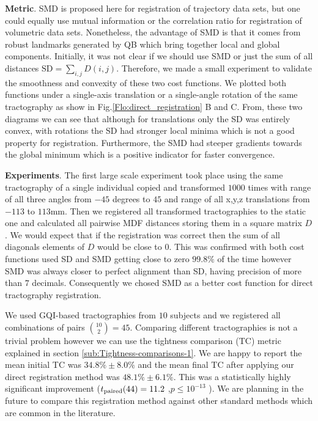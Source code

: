 \documentclass[preprint,authoryear,a4paper,10pt,onecolumn]{elsarticle}
\begin{document}
\textbf{Metric}. SMD is proposed here for registration of trajectory
data sets, but one could equally use mutual
information\cite{maes1997multimodality} or the correlation ratio
\cite{roche1998correlation} for registration of volumetric data
sets. Nonetheless, the advantage of SMD is that it comes from robust
landmarks generated by QB which bring together local and global
components. Initially, it was not clear if we should use SMD or just the
sum of all distances $\mathrm{SD}=\sum_{i,j}D(i,j)$.  Therefore, we made
a small experiment to validate the smoothness and convexity of these two
cost functions. We plotted both functions under a single-axis
translation or a single-angle rotation of the same tractography as show
in Fig.\ref{Flo:direct_registration} B and C. From, these two diagrams
we can see that although for translations only the SD was entirely
convex, with rotations the SD had stronger local minima which is not a
good property for registration. Furthermore, the SMD had steeper
gradients towards the global minimum which is a positive indicator for
faster convergence.

\textbf{Experiments}. The first large scale experiment took place using
the same tractography of a single individual copied and transformed
$1000$ times with range of all three angles from $-45$ degrees to $45$
and range of all x,y,z translations from $-113$ to $113$mm.  Then we
registered all transformed tractographies to the static one and
calculated all pairwise MDF distances storing them in a square matrix
$D$. We would expect that if the registration was correct then the sum
of all diagonals elements of $D$ would be close to $0$.  This was
confirmed with both cost functions used SD and SMD getting close to zero
$99.8\%$ of the time however SMD was always closer to perfect alignment
than SD, having precision of more than $7$ decimals.  Consequently we
chosed SMD as a better cost function for direct tractography
registration.

We used GQI-based tractographies from $10$ subjects and we registered
all combinations of pairs $\binom{10}{2}=45$. Comparing different
tractographies is not a trivial problem however we can use the tightness
comparison (TC) metric explained in section
\ref{sub:Tightness-comparisons-1}.  We are happy to report the mean
initial TC was $34.8\%\pm8.0\%$ and the mean final TC after applying our
direct registration method was $48.1\%\pm6.1\%$. This was a
statistically highly significant improvement
($t_{\text{\textrm{paired}}}(44)=11.2$ ,$p\leq10^{-13}$ ). We are
planning in the future to compare this registration method against other
standard methods which are common in the literature.
\end{document}
